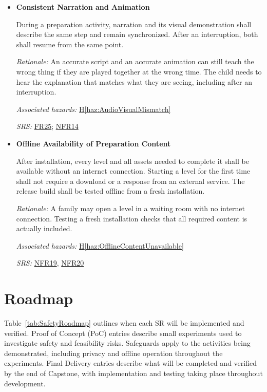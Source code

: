 \documentclass{article}
\newcounter{hazard}
\newcommand{\hazref}[1]{\hyperref[haz:#1]{H\ref*{haz:#1}}}
\newcounter{sr}
\newcommand{\srdef}[1]{\refstepcounter{sr}\label{sr:#1}\textbf{SR-\thesr:}}
\newcommand{\srsurl}{https://team-hindsight.github.io/ophthamology-game/SRS-IEEE/SRS.pdf}
\newcommand{\srsfrref}[2]{\href{\srsurl\#nameddest=#1}{FR#2}}
\newcommand{\srsnfrref}[2]{\href{\srsurl\#nameddest=#1}{NFR#2}}
\begin{document}
\begin{itemize}[leftmargin=1.5cm, labelwidth=1.3cm, labelsep=0.2cm,
  align=left, itemsep=1.2em, parsep=0.6em]
\item[\srdef{ConsistentAudioVisuals}]
\textbf{Consistent Narration and Animation}

During a preparation activity, narration and its visual
demonstration shall describe the same step and
remain synchronized. After an interruption, both shall
resume from the same point.

\textit{Rationale:}
An accurate script and an accurate animation can still
teach the wrong thing if they are played together at the
wrong time. The child needs to hear the explanation that
matches what they are seeing, including after an interruption.

\textit{Associated hazards:}
\hazref{AudioVisualMismatch}

\textit{SRS:} \srsfrref{FR_Suspend}{25}; \srsnfrref{NFR_AVSync}{14}

\item[\srdef{OfflinePreparation}]
\textbf{Offline Availability of Preparation Content}

After installation, every level and all assets
needed to complete it shall be available without an internet
connection. Starting a level for the first time shall not
require a download or a response from an external service.
The release build shall be tested offline from a fresh
installation.

\textit{Rationale:}
A family may open a level in a waiting room with no
internet connection. Testing a fresh installation checks that all
required content is actually included.

\textit{Associated hazards:}
\hazref{OfflineContentUnavailable}

\textit{SRS:} \srsnfrref{NFR_Offline}{19}, \srsnfrref{NFR_Installability}{20}

\end{itemize}

\section{Roadmap}
\label{sec_Roadmap}

Table~\ref{tab:SafetyRoadmap} outlines when each SR will be
implemented and verified. Proof of Concept (PoC) entries describe small experiments used to investigate
safety and feasibility risks. Safeguards apply to the activities being
demonstrated, including privacy and offline operation throughout the experiments.
Final Delivery entries describe what will be completed and verified by the end
of Capstone, with implementation and testing taking place throughout development.
\end{document}

